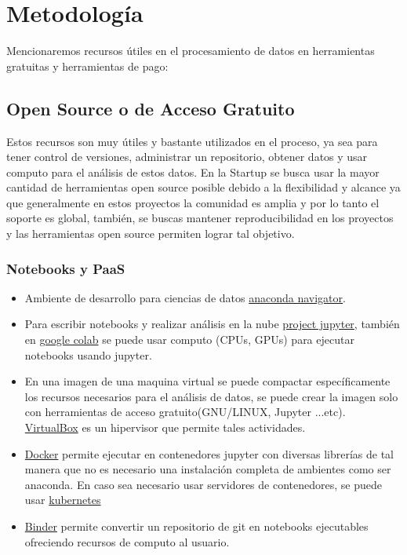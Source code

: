 \documentclass[12pt,a4paper,openright]{article}
\begin{document}

\section{Metodolog\'ia}
Mencionaremos recursos \'utiles en el procesamiento de datos en herramientas gratuitas y herramientas de pago:
\subsection{Open Source o de Acceso Gratuito}
Estos recursos son muy útiles y bastante utilizados en el proceso, ya sea para tener control de versiones, administrar un repositorio, obtener datos y usar computo para el análisis de estos datos. En la Startup se busca usar la mayor cantidad de herramientas open source posible debido a la flexibilidad y alcance ya que generalmente en estos proyectos la comunidad es amplia y por lo tanto el soporte es global, también, se buscas mantener reproducibilidad en los proyectos y las herramientas open source permiten lograr tal objetivo.

\subsubsection{Notebooks y PaaS}

\begin{itemize}
    \item Ambiente de desarrollo para ciencias de datos \href{https://www.anaconda.com/}{anaconda navigator}.
    \item Para escribir notebooks y realizar análisis en la nube \href{https://jupyter.org/}{project jupyter}, también en \href{https://colab.research.google.com/notebooks/intro.ipynb?utm_source=scs-index}{google colab} se puede usar computo (CPUs, GPUs) para ejecutar notebooks usando jupyter.
    \item En una imagen de una maquina virtual se puede compactar específicamente los recursos necesarios para el análisis de datos, se puede crear la imagen solo con herramientas de acceso gratuito(GNU/LINUX, Jupyter ...etc). \href{https://www.virtualbox.org/}{VirtualBox} es un hipervisor que permite tales actividades.
    
    
    \item \href{https://hub.docker.com/}{Docker} permite ejecutar en contenedores jupyter con diversas librerías de tal manera que no es necesario una instalación completa de ambientes como ser anaconda. En caso sea necesario usar servidores de contenedores, se puede usar \href{https://kubernetes.io/ }{kubernetes} 
    \item \href{https://mybinder.org/}{Binder} permite convertir un repositorio de git en notebooks ejecutables ofreciendo recursos de computo al usuario.
    
\end{itemize}
\end{document}
